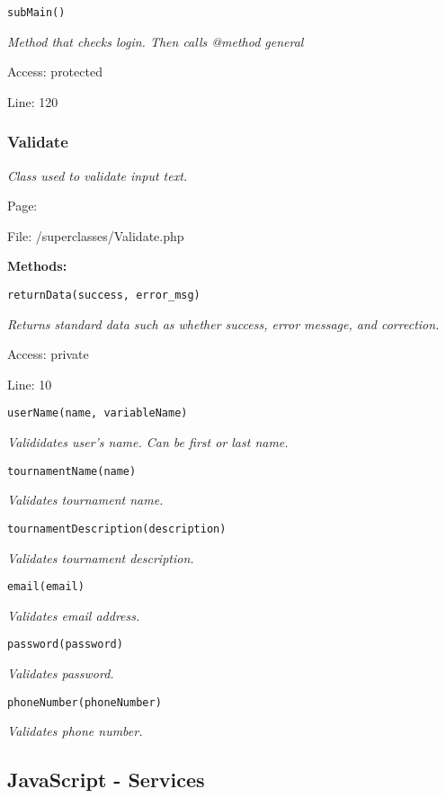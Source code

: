 \texttt{subMain()}

{\scriptsize
\textit{Method that checks login.
Then calls @method general}

Access: protected

Line: 120

}

\subsubsection{Validate}\label{Validate.php.doc}
\textit{Class used to validate input text.}

Page: \pageref{Validate.php}

File: /superclasses/Validate.php

\textbf{Methods:}

\texttt{returnData(success, error\_msg)}

{\scriptsize
\textit{Returns standard data such as whether success, error message, and correction.}

Access: private

Line: 10

}

\texttt{userName(name, variableName)}

{\scriptsize
\textit{Valididates user's name.
Can be first or last name.}

}

\texttt{tournamentName(name)}

{\scriptsize
\textit{Validates tournament name.}

}

\texttt{tournamentDescription(description)}

{\scriptsize
\textit{Validates tournament description.}

}

\texttt{email(email)}

{\scriptsize
\textit{Validates email address.}

}

\texttt{password(password)}

{\scriptsize
\textit{Validates password.}

}

\texttt{phoneNumber(phoneNumber)}

{\scriptsize
\textit{Validates phone number.}

}

\subsection{JavaScript - Services}
